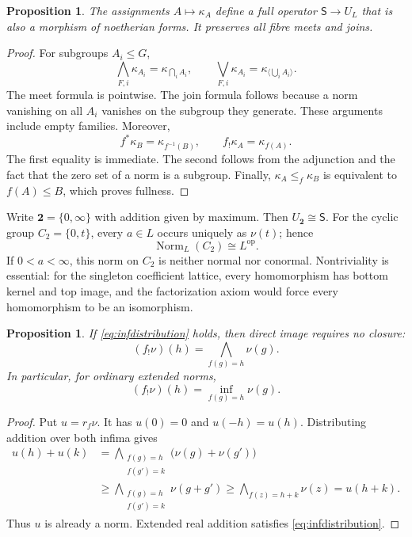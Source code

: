 \documentclass[12pt,a4paper]{amsart}
\newtheorem{proposition}[theorem]{Proposition}
\theoremstyle{definition}
\newcommand{\op}{\mathrm{op}}
\newcommand{\two}{\mathbf{2}}
\newcommand{\Norm}{\operatorname{Norm}}
\begin{document}
\begin{proposition}\label{prop:characteristic}
The assignments $A\mapsto\kappa_A$ define a full operator $\mathsf S\to U_L$ that is also a morphism of noetherian forms. It preserves all fibre meets and joins.
\end{proposition}
\begin{proof}
For subgroups $A_i\leq G$,
\[
 \bigwedge_{F,i}\kappa_{A_i}=\kappa_{\bigcap_iA_i},\qquad
 \bigvee_{F,i}\kappa_{A_i}=\kappa_{\langle\bigcup_iA_i\rangle}.
\]
The meet formula is pointwise. The join formula follows because a norm vanishing on all $A_i$ vanishes on the subgroup they generate. These arguments include empty families. Moreover,
\[
 f^*\kappa_B=\kappa_{f^{-1}(B)},\qquad
 f_!\kappa_A=\kappa_{f(A)}.
\]
The first equality is immediate. The second follows from the adjunction and the fact that the zero set of a norm is a subgroup.
Finally, $\kappa_A\leq_f\kappa_B$ is equivalent to $f(A)\leq B$, which proves fullness.
\end{proof}

Write $\two=\{0,\infty\}$ with addition given by maximum. Then $U_{\two}\cong\mathsf S$.
For the cyclic group $C_2=\{0,t\}$, every $a\in L$ occurs uniquely as $\nu(t)$; hence
\begin{equation}\label{eq:C2}
                              \Norm_L(C_2)\cong L^{\op}.
\end{equation}
If $0<a<\infty$, this norm on $C_2$ is neither normal nor conormal.
Nontriviality is essential: for the singleton coefficient lattice, every homomorphism has bottom kernel and top image, and the factorization axiom would force every homomorphism to be an isomorphism.

\begin{proposition}\label{prop:quantaledirect}
If \eqref{eq:infdistribution} holds, then direct image requires no closure:
\[
                    (f_!\nu)(h)=\bigwedge_{f(g)=h}\nu(g).
\]
In particular, for ordinary extended norms,
\[
                    (f_!\nu)(h)=\inf_{f(g)=h}\nu(g).
\]
\end{proposition}
\begin{proof}
Put $u=r_f\nu$. It has $u(0)=0$ and $u(-h)=u(h)$. Distributing addition over both infima gives
\[
 \begin{aligned}
 u(h)+u(k)
 &=\bigwedge_{\substack{f(g)=h\\f(g')=k}}
       \bigl(\nu(g)+\nu(g')\bigr)\\
 &\geq\bigwedge_{\substack{f(g)=h\\f(g')=k}}\nu(g+g')
 \geq\bigwedge_{f(z)=h+k}\nu(z)=u(h+k).
 \end{aligned}
\]
Thus $u$ is already a norm. Extended real addition satisfies \eqref{eq:infdistribution}.
\end{proof}
\end{document}
